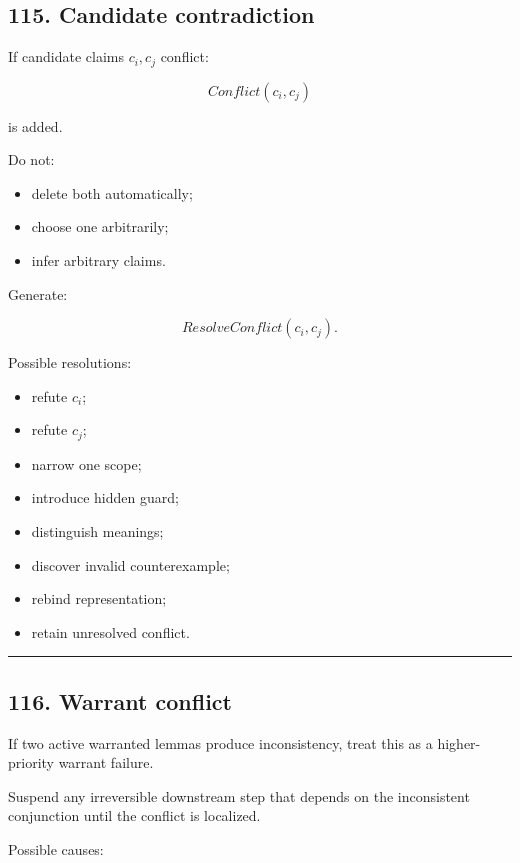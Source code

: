 \documentclass[
]{article}
\providecommand{\tightlist}{%
  \setlength{\itemsep}{0pt}\setlength{\parskip}{0pt}}
\begin{document}
\subsection{115. Candidate contradiction}\label{candidate-contradiction}

If candidate claims \(c_i,c_j\) conflict:

\[
\boxed{
Conflict(c_i,c_j)
}
\]

is added.

Do not:

\begin{itemize}
\tightlist
\item
  delete both automatically;
\item
  choose one arbitrarily;
\item
  infer arbitrary claims.
\end{itemize}

Generate:

\[
\boxed{
ResolveConflict(c_i,c_j).
}
\]

Possible resolutions:

\begin{itemize}
\tightlist
\item
  refute \(c_i\);
\item
  refute \(c_j\);
\item
  narrow one scope;
\item
  introduce hidden guard;
\item
  distinguish meanings;
\item
  discover invalid counterexample;
\item
  rebind representation;
\item
  retain unresolved conflict.
\end{itemize}

\begin{center}\rule{0.5\linewidth}{0.5pt}\end{center}

\subsection{116. Warrant conflict}\label{warrant-conflict}

If two active warranted lemmas produce inconsistency, treat this as a
higher-priority warrant failure.

Suspend any irreversible downstream step that depends on the
inconsistent conjunction until the conflict is localized.

Possible causes:
\end{document}
